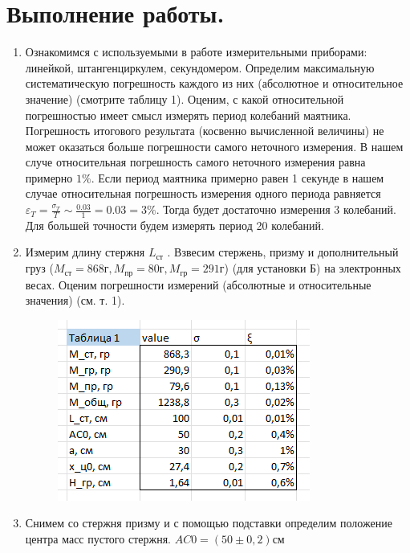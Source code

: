 \documentclass[a4paper,12pt]{article} %
\begin{document}
\section{Выполнение работы.}
\begin{enumerate}

\item Ознакомимся с используемыми в работе измерительными приборами: линейкой, штангенциркулем, секундомером.
Определим максимальную систематическую погрешность каждого из них (абсолютное и относительное значение) (смотрите таблицу 1).
Оценим, с какой относительной погрешностью имеет смысл измерять период колебаний маятника. Погрешность итогового результата (косвенно вычисленной величины) не может оказаться больше погрешности самого неточного измерения.
В нашем случе относительная погрешность самого неточного измерения равна примерно $1\%$.
Если период маятника примерно равен 1 секунде в нашем случае относительная погрешность измерения одного периода равняется $\varepsilon_T = \frac{\sigma_T}{T} \sim \frac{0.03}{1} = 0.03 = 3\%$. Тогда будет достаточно измерения 3 колебаний. Для большей точности будем измерять период 20 колебаний.

\item Измерим длину стержня $L_{\text{ст}}$ . Взвесим стержень, призму и дополнительный
груз ($M_{\text{ст}} = 868 \text{г}, M_{\text{пр}} = 80 \text{г}, M_{\text{гр}} = 291 \text{г}$) (для установки Б) на электронных весах. Оценим погрешности
измерений (абсолютные и относительные значения) (см. т. 1).

\begin{figure} [H]
	\center
	\includegraphics[scale = 0.8]{data/таблица 1.png}
\end{figure}

\item Снимем со стержня призму и с помощью подставки определим положение центра масс пустого стержня.
$AC0 = (50 \pm 0,2)\text{см}$


\end{enumerate}
\end{document}

